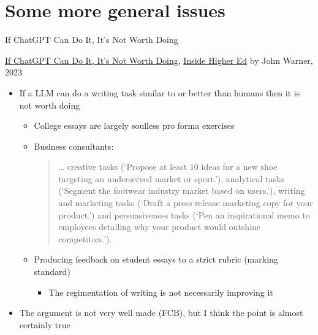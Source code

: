 \section{Some more general issues}


\begin{frame}{If ChatGPT Can Do It, It’s Not Worth Doing}

\href{https://www.insidehighered.com/opinion/blogs/just-visiting/2023/09/20/chatgpt-shows-way-toward-our-own-humanity}{If ChatGPT Can Do It, It’s Not Worth Doing}, 
\href{https://www.insidehighered.com/}{Inside Higher Ed} by  John Warner,  2023

\begin{itemize}
\item If a LLM can do a writing task similar to or better than humans
  then it is not worth doing
  \begin{itemize}
  \item College essays are largely soulless pro forma exercises
  \item Business consultants:
    \begin{quote}
      … creative tasks (‘Propose at least 10 ideas for a new shoe targeting an underserved market or sport.’), analytical tasks (‘Segment the footwear industry market based on users.’), writing and marketing tasks (‘Draft a press release marketing copy for your product.’) and persuasiveness tasks (‘Pen an inspirational memo to employees detailing why your product would outshine competitors.’).
    \end{quote}
    
  \item Producing feedback on student essays to a strict rubric
    (marking standard)
    \begin{itemize}
    \item The regimentation of writing is not necessarily improving it
    \end{itemize}
  \end{itemize}
\item The argument is not very well made (FCB), but I think the point is almost certainly true
\end{itemize}


\end{frame}

